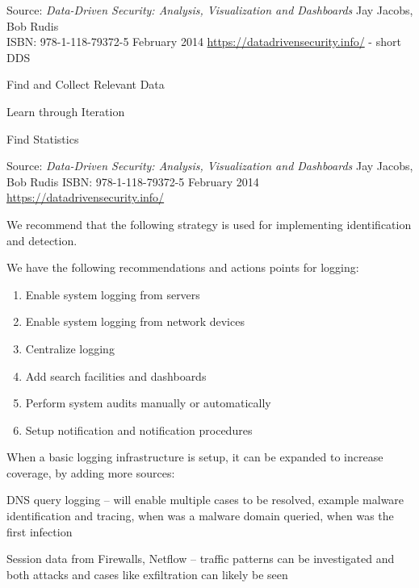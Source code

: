 \documentclass[Screen16to9,17pt]{foils}
\begin{document}
Source: \emph{Data-Driven Security: Analysis, Visualization and Dashboards} Jay Jacobs, Bob Rudis\\
ISBN: 978-1-118-79372-5 February 2014 \url{https://datadrivensecurity.info/} - short DDS






\begin{list2}
\item Find and Collect Relevant Data
\item Learn through Iteration
\item Find Statistics
\end{list2}
Source: \emph{Data-Driven Security: Analysis, Visualization and Dashboards} Jay Jacobs, Bob Rudis
ISBN: 978-1-118-79372-5 February 2014 \url{https://datadrivensecurity.info/}




We recommend that the following strategy is used for implementing identification and detection.

We have the following recommendations and actions points for logging:
\begin{enumerate}
\item[\faSquareO] Enable system logging from servers
\item[\faSquareO] Enable system logging from network devices
\item[\faSquareO] Centralize logging
\item[\faSquareO] Add search facilities and dashboards
\item[\faSquareO] Perform system audits manually or automatically
\item[\faSquareO] Setup notification and notification procedures
\end{enumerate}

When a basic logging infrastructure is setup, it can be expanded to increase coverage, by
adding more sources:

\begin{list2}
\item DNS query logging -- will enable multiple cases to be resolved, example malware identification and tracing, when was a malware domain queried, when was the first infection
\item Session data from Firewalls, Netflow -- traffic patterns can be investigated and both attacks and cases like exfiltration can likely be seen
\end{list2}
\end{document}
